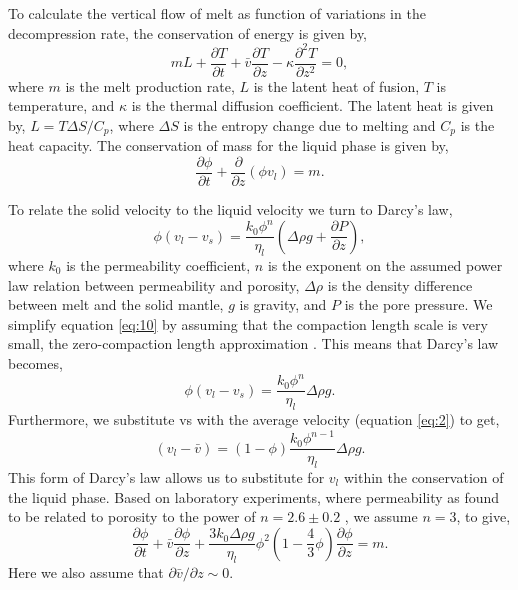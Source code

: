 \documentclass[draft,grl]{agutexSI2018}
\begin{document}
\begin{article}
To calculate the vertical flow of melt as function of variations in the decompression rate, the conservation of energy is given by,
\begin{equation}
mL + \frac{\partial T}{\partial t} + \bar{v}\frac{\partial T}{\partial z} - \kappa\frac{\partial^{2} T}{\partial z^{2}} = 0,
\label{eq:8}
\end{equation}
where $m$ is the melt production rate, $L$ is the latent heat of fusion, $T$ is temperature, and $\kappa$ is the thermal diffusion coefficient. The latent heat is given by, $L = T\Delta S/C_{p}$, where $\Delta S$ is the entropy change due to melting and $C_{p}$ is the heat capacity. The conservation of mass for the liquid phase is given by,
\begin{equation}
\frac{\partial \phi}{\partial t} + \frac{\partial}{\partial z}\left(\phi v_{l}\right) = m.
\label{eq:9}
\end{equation}

To relate the solid velocity to the liquid velocity we turn to Darcy's law,
\begin{equation}
\phi\left(v_{l}-v_{s}\right) = \frac{k_{0}\phi^{n}}{\eta_{l}}\left(\Delta\rho g + \frac{\partial P}{\partial z}\right),
\label{eq:10}
\end{equation}
where $k_{0}$ is the permeability coefficient, $n$ is the exponent on the assumed power law relation between permeability and porosity, $\Delta\rho$ is the density difference between melt and the solid mantle, $g$ is gravity, and $P$ is the pore pressure. We simplify equation \ref{eq:10} by assuming that the compaction length scale is very small, the zero-compaction length approximation \citep{ribe-1985}. This means that Darcy's law becomes,
\begin{equation}
\phi\left(v_{l}-v_{s}\right) = \frac{k_{0}\phi^{n}}{\eta_{l}} \Delta\rho g.
\label{eq:11}
\end{equation}
Furthermore, we substitute vs with the average velocity (equation \ref{eq:2}) to get,
\begin{equation}
\left(v_{l}-\bar{v}\right) = \left(1-\phi\right)\frac{k_{0}\phi^{n-1}}{\eta_{l}} \Delta\rho g.
\label{eq:12}
\end{equation}
This form of Darcy's law allows us to substitute for $v_{l}$ within the conservation of the liquid phase. Based on laboratory experiments, where permeability as found to be related to porosity to the power of $n = 2.6\pm0.2$ \citep{miller-etal-2014}, we assume $n=3$, to give,
\begin{equation}
\frac{\partial \phi}{\partial t} + \bar{v} \frac{\partial \phi}{\partial z} + \frac{3k_{0}\Delta\rho g}{\eta_{l}} \phi^{2}\left(1-\frac{4}{3}\phi\right)\frac{\partial \phi}{\partial z} = m.
\label{eq:13}
\end{equation}
Here we also assume that $\partial\bar{v}/\partial z \sim 0$.


\end{article}
\end{document}
